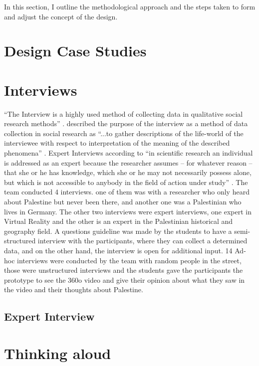 In this section, I outline the methodological approach and the steps taken to form and adjust the concept of the design. 

\section{Design Case Studies}



\section{Interviews}

“The Interview is a highly used method of collecting data in qualitative social research methods” \citep{Anyan2013}. \cite{Kvale1983} described the purpose of the interview as a method of data collection in social research as “...to gather descriptions of the life-world of the interviewee with respect to interpretation of the meaning of the described phenomena” \cite[p.174]{Kvale1983}. Expert Interviews according to \cite{Christmann2016}  “in scientific research an individual is addressed as an expert because the researcher assumes – for whatever reason – that she or he has knowledge, which she or he may not necessarily possess alone, but which is not accessible to anybody in the field of action under study” \cite[p.18]{Christmann2016}. The team conducted 4 interviews. one of them was with a researcher who only heard about Palestine but never been there, and another one was a Palestinian who lives in Germany. The other two interviews were expert interviews, one expert in Virtual Reality and the other is an expert in the Palestinian historical and geography field. A questions guideline was made by the students to have a semi-structured interview with the participants, where they can collect a determined data, and on the other hand, the interview is open for additional input. 14 Ad-hoc interviews were conducted by the team with random people in the street, those were unstructured interviews and the students gave the participants the prototype to see the 360o video and give their opinion about what they saw in the video and their thoughts about Palestine.

\subsection{Expert Interview}



\section{Thinking aloud}

